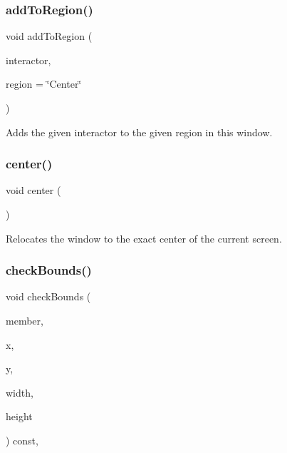 \subsubsection{\texorpdfstring{add\+To\+Region()}{addToRegion()}\hspace{0.1cm}{\footnotesize\ttfamily [4/4]}}
{\footnotesize\ttfamily void add\+To\+Region (\begin{DoxyParamCaption}\item[{\mbox{\hyperlink{classGInteractor}{G\+Interactor}} \&}]{interactor,  }\item[{const std\+::string \&}]{region = {\ttfamily \char`\"{}Center\char`\"{}} }\end{DoxyParamCaption})\hspace{0.3cm}{\ttfamily [virtual]}}



Adds the given interactor to the given region in this window. 

\mbox{\label{classGWindow_a5013a22e5b1f902226b7394353f884ff}} 
\subsubsection{\texorpdfstring{center()}{center()}}
{\footnotesize\ttfamily void center (\begin{DoxyParamCaption}{ }\end{DoxyParamCaption})\hspace{0.3cm}{\ttfamily [virtual]}}



Relocates the window to the exact center of the current screen. 

\mbox{\label{classGDrawingSurface_a3a690bcb2d62250c9e4722ad7c1b9ab6}} 
\subsubsection{\texorpdfstring{check\+Bounds()}{checkBounds()}}
{\footnotesize\ttfamily void check\+Bounds (\begin{DoxyParamCaption}\item[{const std\+::string \&}]{member,  }\item[{double}]{x,  }\item[{double}]{y,  }\item[{double}]{width,  }\item[{double}]{height }\end{DoxyParamCaption}) const\hspace{0.3cm}{\ttfamily [protected]}, {\ttfamily [inherited]}}



